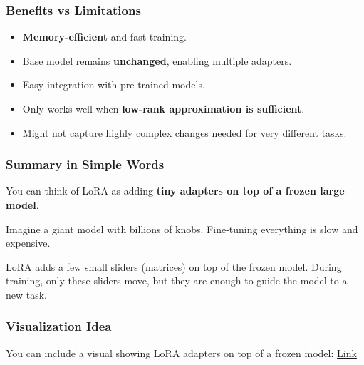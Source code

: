 \subsubsection{Benefits vs Limitations}
\begin{tcolorbox}[colback=blue!5!white,colframe=blue!75!black,title=Pros]
\begin{itemize}
    \item \textbf{Memory-efficient} and fast training.
    \item Base model remains \textbf{unchanged}, enabling multiple adapters.
    \item Easy integration with pre-trained models.
\end{itemize}
\end{tcolorbox}

\begin{tcolorbox}[colback=red!5!white,colframe=red!75!black,title=Cons]
\begin{itemize}
    \item Only works well when \textbf{low-rank approximation is sufficient}.
    \item Might not capture highly complex changes needed for very different tasks.
\end{itemize}
\end{tcolorbox}

\subsubsection{Summary in Simple Words}
\begin{tcolorbox}[colback=blue!5!white,colframe=blue!75!black,title=LoRA Simplified]
You can think of LoRA as adding \textbf{tiny adapters on top of a frozen large model}.  

Imagine a giant model with billions of knobs. Fine-tuning everything is slow and expensive.  

LoRA adds a few small sliders (matrices) on top of the frozen model.  
During training, only these sliders move, but they are enough to guide the model to a new task.
\end{tcolorbox}
\newpage
\subsubsection{Visualization Idea}
You can include a visual showing LoRA adapters on top of a frozen model:
\href{https://blog.dailydoseofds.com/p/full-model-fine-tuning-vs-lora-vs}{Link}



